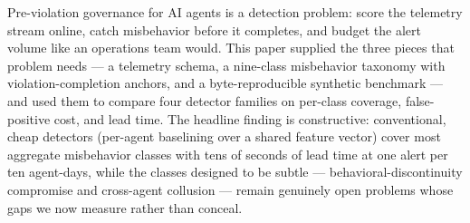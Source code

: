\documentclass[10pt]{article}
\begin{document}
Pre-violation governance for AI agents is a detection problem: score the
telemetry stream online, catch misbehavior before it completes, and budget the
alert volume like an operations team would. This paper supplied the three
pieces that problem needs --- a telemetry schema, a nine-class misbehavior
taxonomy with violation-completion anchors, and a byte-reproducible synthetic
benchmark --- and used them to compare four detector families on per-class
coverage, false-positive cost, and lead time. The headline finding is
constructive: conventional, cheap detectors (per-agent baselining over a shared
feature vector) cover most aggregate misbehavior classes with tens of seconds
of lead time at one alert per ten agent-days, while the classes designed to be
subtle --- behavioral-discontinuity compromise and cross-agent collusion ---
remain genuinely open problems whose gaps we now measure rather than
conceal.



\end{document}
